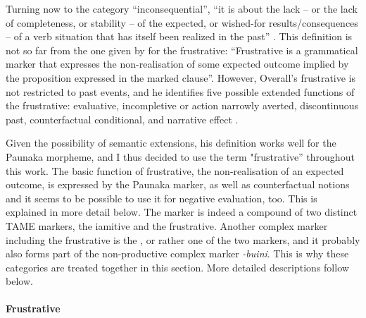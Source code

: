 Turning now to the category “inconsequential”,  “it is about the lack – or the lack of completeness, or stability -- of the expected, or wished-for results/consequences -- of a verb situation that has itself been realized in the past” \citep[874]{Kuteva2019}. This definition is not so far from the one given by \citet[479]{Overall2017} for the frustrative: “Frustrative is a grammatical marker that expresses the non-realisation of some expected outcome implied by the proposition expressed in the marked clause”. However, Overall’s frustrative is not restricted to past events, and he identifies five possible extended functions of the frustrative: evaluative, incompletive or action narrowly averted, discontinuous past, counterfactual conditional, and narrative effect \citep[484]{Overall2017}.

Given the possibility of semantic extensions, his definition works well for the Paunaka morpheme, and I thus decided to use the term "frustrative” throughout this work. The basic function of frustrative, the non-realisation of an expected outcome, is expressed by the Paunaka marker, as well as counterfactual notions and it seems to be possible to use it for negative evaluation, too. This is explained in more detail below. The  marker is indeed a compound of two distinct TAME markers, the iamitive and the frustrative. Another complex marker including the frustrative is the , or rather one of the two  markers, and it probably also forms part of the non-productive complex marker \textit{-buini}. This is why these categories are treated together in this section. More detailed descriptions follow below.


\paragraph{Frustrative}\label{sec:Frustrative}


